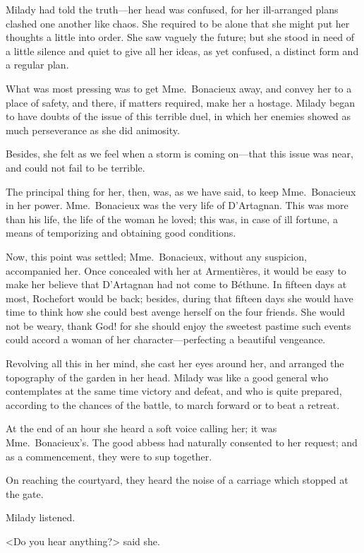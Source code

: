 Milady had told the truth—her head was confused, for her ill-arranged plans clashed one another like chaos. She required to be alone that she might put her thoughts a little into order. She saw vaguely the future; but she stood in need of a little silence and quiet to give all her ideas, as yet confused, a distinct form and a regular plan. 

What was most pressing was to get Mme.~Bonacieux away, and convey her to a place of safety, and there, if matters required, make her a hostage. Milady began to have doubts of the issue of this terrible duel, in which her enemies showed as much perseverance as she did animosity. 

Besides, she felt as we feel when a storm is coming on—that this issue was near, and could not fail to be terrible. 

The principal thing for her, then, was, as we have said, to keep Mme.~Bonacieux in her power. Mme.~Bonacieux was the very life of D'Artagnan. This was more than his life, the life of the woman he loved; this was, in case of ill fortune, a means of temporizing and obtaining good conditions. 

Now, this point was settled; Mme.~Bonacieux, without any suspicion, accompanied her. Once concealed with her at Armentières, it would be easy to make her believe that D'Artagnan had not come to Béthune. In fifteen days at most, Rochefort would be back; besides, during that fifteen days she would have time to think how she could best avenge herself on the four friends. She would not be weary, thank God! for she should enjoy the sweetest pastime such events could accord a woman of her character—perfecting a beautiful vengeance. 

Revolving all this in her mind, she cast her eyes around her, and arranged the topography of the garden in her head. Milady was like a good general who contemplates at the same time victory and defeat, and who is quite prepared, according to the chances of the battle, to march forward or to beat a retreat. 

At the end of an hour she heard a soft voice calling her; it was Mme.~Bonacieux's. The good abbess had naturally consented to her request; and as a commencement, they were to sup together. 

On reaching the courtyard, they heard the noise of a carriage which stopped at the gate. 

Milady listened. 

<Do you hear anything?> said she. 


